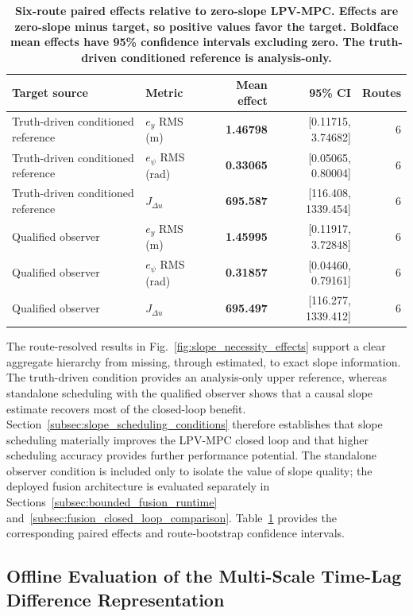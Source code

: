\documentclass{ieeeaccess}
\begin{document}
\begin{table}[!tbp]
\centering
\caption{\textbf{Six-route paired effects relative to zero-slope LPV-MPC. Effects are zero-slope minus target, so positive values favor the target. Boldface mean effects have 95\% confidence intervals excluding zero. The truth-driven conditioned reference is analysis-only.}}
\label{tab:slope_necessity_effects}
\setlength{\tabcolsep}{3pt}
\begin{tabular}{|l|l|r|r|r|}
\hline
Target source & Metric & Mean effect & 95\% CI & Routes \\
\hline
Truth-driven conditioned reference & $e_y$ RMS (m) & \textbf{1.46798} & [0.11715, 3.74682] & 6 \\
Truth-driven conditioned reference & $e_\psi$ RMS (rad) & \textbf{0.33065} & [0.05065, 0.80004] & 6 \\
Truth-driven conditioned reference & $J_{\Delta u}$ & \textbf{695.587} & [116.408, 1339.454] & 6 \\
Qualified observer & $e_y$ RMS (m) & \textbf{1.45995} & [0.11917, 3.72848] & 6 \\
Qualified observer & $e_\psi$ RMS (rad) & \textbf{0.31857} & [0.04460, 0.79161] & 6 \\
Qualified observer & $J_{\Delta u}$ & \textbf{695.497} & [116.277, 1339.412] & 6 \\
\hline
\end{tabular}
\end{table}

The route-resolved results in Fig.~\ref{fig:slope_necessity_effects} support a clear aggregate hierarchy from missing, through estimated, to exact slope information. The truth-driven condition provides an analysis-only upper reference, whereas standalone scheduling with the qualified observer shows that a causal slope estimate recovers most of the closed-loop benefit. Section~\ref{subsec:slope_scheduling_conditions} therefore establishes that slope scheduling materially improves the LPV-MPC closed loop and that higher scheduling accuracy provides further performance potential. The standalone observer condition is included only to isolate the value of slope quality; the deployed fusion architecture is evaluated separately in Sections~\ref{subsec:bounded_fusion_runtime} and~\ref{subsec:fusion_closed_loop_comparison}. Table~\ref{tab:slope_necessity_effects} provides the corresponding paired effects and route-bootstrap confidence intervals.

\subsection{Offline Evaluation of the Multi-Scale Time-Lag Difference Representation}
\label{subsec:offline_delta_lag_evaluation}
\end{document}
